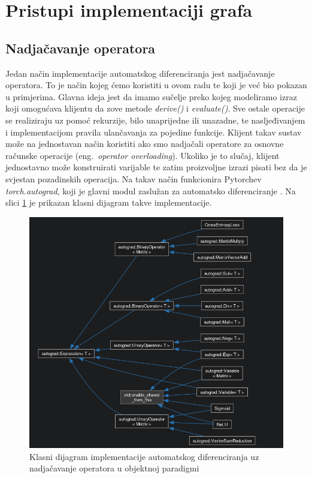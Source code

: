 \documentclass[zavrsnirad]{fer}
\begin{document}
\pagebreak
\section{Pristupi implementaciji grafa}
\subsection{Nadjačavanje operatora}

Jedan način implementacije automatskog diferenciranja jest nadjačavanje operatora. To je način kojeg ćemo koristiti u ovom radu te koji je već bio pokazan u primjerima. Glavna ideja jest da imamo sučelje preko kojeg modeliramo izraz koji omogućava klijentu da zove metode \textit{derive()} i \textit{evaluate()}. Sve ostale operacije se realiziraju uz pomoć rekurzije, bilo unaprijedne ili unazadne, te nasljeđivanjem i implementacijom pravila ulančavanja za pojedine funkcije.
Klijent takav sustav može na jednostavan način koristiti ako smo nadjačali operatore za osnovne računske operacije (eng.\ \textit{operator overloading}). Ukoliko je to slučaj, klijent jednostavno može konstruirati varijable te zatim proizvoljne izrazi pisati bez da je svjestan pozadinskih operacija. Na takav način funkcionira Pytorchev \textit{torch.autograd}, koji je glavni modul zaslužan za automatsko diferenciranje \cite{docs:autograd}. Na slici \ref{slk:klasni} je prikazan klasni dijagram takve implementacije.
\\

\begin{figure}[h]
  \centering
  \includegraphics[width=0.7\linewidth]{./slike/klasni_dijagram.png}
  \caption{Klasni dijagram implementacije automatskog diferenciranja uz nadjačavanje operatora u objektnoj paradigmi}
  \label{slk:klasni}
\end{figure}
\end{document}
